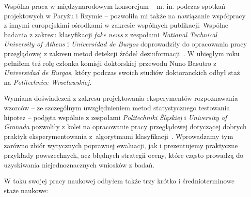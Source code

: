 Wspólna praca w międzynarodowym konsorcjum -- m. in. podczas spotkań projektowych w Paryżu i Rzymie -- pozwoliła mi także na nawiązanie współpracy z innymi europejskimi ośrodkami w zakresie wspólnych publikacji. Wspólne badania z zakresu klasyfikacji \emph{fake news} z zespołami \emph{National Technical University of Athens} i \emph{Universidad de Burgos} doprowadziły do opracowania pracy przeglądowej z zakresu metod detekcji źródeł dezinformacji~. W ubiegłym roku pełniłem też rolę członka komisji doktorskiej przewodu Nuno Basutro z \emph{Universidad de Burgos}, który podczas swoich studiów doktoranckich odbył staż na \emph{Politechnice Wrocławskiej}.

Wymiana doświadczeń z zakresu projektowania eksperymentów rozpoznawania wzorców -- ze szczególnym uwzględnieniem metod statystycznego testowania hipotez -- podjęta wspólnie z zespołami \emph{Politechniki Śląskiej} i \emph{University of Granada} pozwoliły z kolei na opracowanie pracy przeglądowej dotyczącej dobrych praktyk eksperymentowania z~algorytmami klasyfikacji~. Wprowadzamy tym zarówno zbiór wytycznych poprawnej ewaluacji, jak i prezentujemy praktyczne przykłady powszechnych, acz błędnych strategii oceny, które często prowadzą do uzyskiwania niejednoznacznych wniosków z badań.\vspace{1em}

\noindent W toku swojej pracy naukowej odbyłem także trzy krótko i średnioterminowe staże naukowe:

